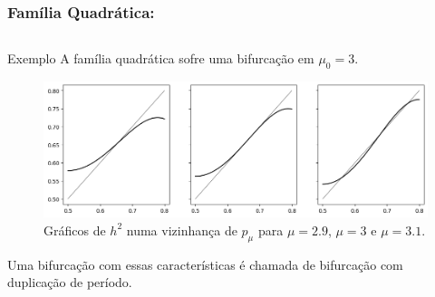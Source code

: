 
\begin{frame}
\vspace{5pt}
\frametitle{Família Quadrática: \subsecname}
\begin{columns}
\column{\dimexpr\paperwidth-15pt}

\begin{block}{Exemplo}
A família quadrática sofre uma bifurcação em $\mu_0 = 3$.

\vspace{10pt}

\begin{figure}[!htb]
\centering
\includegraphics[scale=0.4]{images/h_3^2.png}
\caption{Gráficos de $h^2$ numa vizinhança de $p_\mu$ para $\mu = 2.9$, $\mu = 3$ e $\mu = 3.1$.}
\end{figure}
Uma bifurcação com essas características é chamada de bifurcação com duplicação de período.
\end{block}

\end{columns}
\end{frame}
%
%
%
%
%
%
%
%
